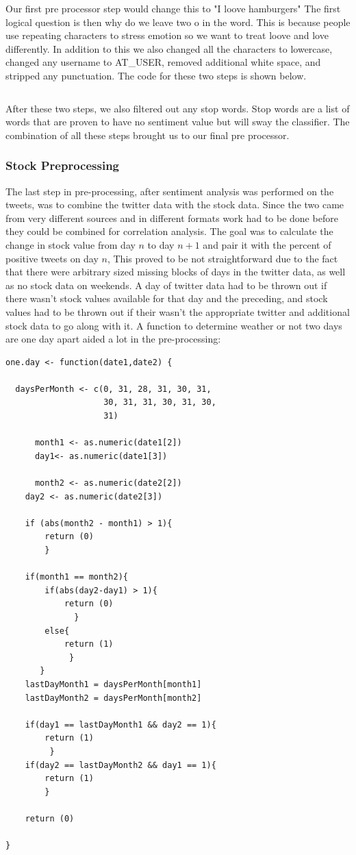 \documentclass{acm_proc_article-sp}
\begin{document}
Our first pre processor step would
change this to "I loove hamburgers" The first logical question is then why do
we leave two o in the word. This is because people use repeating characters to
stress emotion so we want to treat loove and love differently. In addition to
this we also changed all the characters to lowercase, changed any username to
AT\_USER, removed additional white space, and stripped any punctuation. The
code for these two steps is shown below.

\break
\inputminted{python}{examples/preTweet.py}

After these two steps, we also filtered out any stop words. Stop words are a
list of words that are proven to have no sentiment value but will sway the
classifier. The combination of all these steps brought us to our final pre
processor.

\subsubsection{Stock Preprocessing}
 
The last step in pre-processing, after sentiment analysis was performed on the
tweets, was to combine the twitter data with the stock data. Since the two came
from very different sources and in different formats work had to be done before
they could be combined for correlation analysis. The goal was to calculate the
change in stock value from day $n$ to day $n+1$ and pair it with the percent of
positive tweets on day $n$, This proved to be not straightforward due to the
fact that there were arbitrary sized missing blocks of days in the twitter
data, as well as no stock data on weekends. A day of twitter data had to be
thrown out if there wasn't stock values available for that day and the
preceding, and stock values had to be thrown out if their wasn't the
appropriate twitter and additional stock data to go along with it. A function
to determine weather or not two days are one day apart aided a lot in the
pre-processing:

\break 
\begin{verbatim}
one.day <- function(date1,date2) {

  daysPerMonth <- c(0, 31, 28, 31, 30, 31, 
                    30, 31, 31, 30, 31, 30, 
                    31)
       
      month1 <- as.numeric(date1[2])
      day1<- as.numeric(date1[3])

      month2 <- as.numeric(date2[2])
    day2 <- as.numeric(date2[3])

    if (abs(month2 - month1) > 1){
        return (0)
        }

    if(month1 == month2){
        if(abs(day2-day1) > 1){
            return (0)
              }
        else{
            return (1)
             }
       }
    lastDayMonth1 = daysPerMonth[month1]
    lastDayMonth2 = daysPerMonth[month2]

    if(day1 == lastDayMonth1 && day2 == 1){
        return (1)
         }
    if(day2 == lastDayMonth2 && day1 == 1){
        return (1)
        }

    return (0)

}

\end{verbatim}
\end{document}
